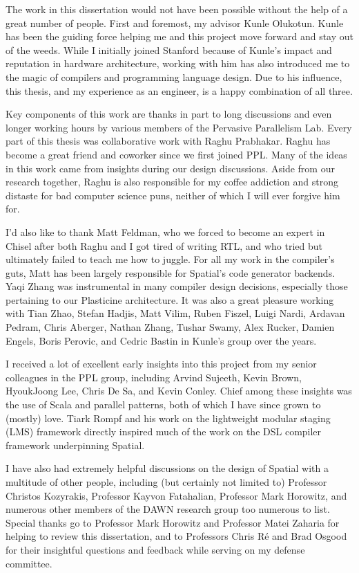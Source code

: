 The work in this dissertation would not have been possible without the help of
a great number of people. First and foremost, my advisor Kunle Olukotun.
Kunle has been the guiding force helping me and this
project move forward and stay out of the weeds. While I initially joined Stanford
because of Kunle's impact and reputation in hardware architecture, working with him
has also introduced me to the magic of compilers and programming language design.
Due to his influence, this thesis, and my experience as an engineer, is a
happy combination of all three.

Key components of this work are thanks in part to long discussions and even longer
working hours by various members of the Pervasive Parallelism Lab.
Every part of this thesis was collaborative work with Raghu Prabhakar.
Raghu has become a great friend and coworker since we first joined PPL. Many of
the ideas in this work came from insights during our design discussions.
Aside from our research together, Raghu is also responsible for my
coffee addiction and strong distaste for bad computer science puns, neither of
which I will ever forgive him for.

I'd also like to thank Matt Feldman, who we forced to become an expert in Chisel
after both Raghu and I got tired of writing RTL,
and who tried but ultimately failed to teach me how to juggle.
For all my work in the compiler's guts, Matt has been largely
responsible for Spatial's code generator backends.
Yaqi Zhang was instrumental in many compiler design decisions, especially those
pertaining to our Plasticine architecture.
It was also a great pleasure working with Tian Zhao, Stefan Hadjis, Matt Vilim,
Ruben Fiszel, Luigi Nardi, Ardavan Pedram, Chris Aberger, Nathan Zhang,
Tushar Swamy, Alex Rucker, Damien Engels, Boris Perovic, and Cedric Bastin
in Kunle's group over the years.

I received a lot of excellent early insights into this project from my senior
colleagues in the PPL group, including Arvind Sujeeth, Kevin Brown, HyoukJoong
Lee, Chris De Sa, and Kevin Conley. Chief among these insights was the use of
Scala and parallel patterns, both of which I have since grown to (mostly) love.
Tiark Rompf and his work on the lightweight modular staging (LMS) framework
directly inspired much of the work on the DSL compiler framework underpinning Spatial.

I have also had extremely helpful discussions on the design of Spatial
with a multitude of other people, including (but certainly not limited to)
Professor Christos Kozyrakis, Professor Kayvon Fatahalian, Professor Mark Horowitz,
and numerous other members of the DAWN research group too numerous to list.
Special thanks go to Professor Mark Horowitz and Professor Matei Zaharia for
helping to review this dissertation, and to Professors Chris R\'{e} and Brad
Osgood for their insightful questions and feedback while
serving on my defense committee.

